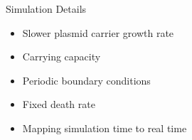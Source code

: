 \documentclass[11pt]{beamer}              %
\begin{document}
\begin{frame}{Simulation Details}

  \begin{itemize}
    \item Slower plasmid carrier growth rate
    \item Carrying capacity
    \item Periodic boundary conditions
    \item Fixed death rate
    \item Mapping simulation time to real time%
  \end{itemize}

\end{frame}


%
%

\end{document}

